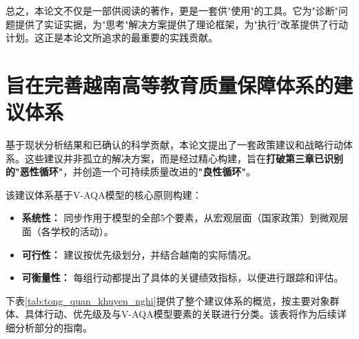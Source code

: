 总之，本论文不仅是一部供阅读的著作，更是一套供"使用"的工具。它为"诊断"问题提供了实证实据，为"思考"解决方案提供了理论框架，为"执行"改革提供了行动计划。这正是本论文所追求的最重要的实践贡献。



\section{旨在完善越南高等教育质量保障体系的建议体系}
\label{sec:he_thong_khuyen_nghi}

基于现状分析结果和已确认的科学贡献，本论文提出了一套政策建议和战略行动体系。这些建议并非孤立的解决方案，而是经过精心构建，旨在\textbf{打破第三章已识别的"恶性循环"}，并创造一个可持续质量改进的\textbf{"良性循环"}。

该建议体系基于V-AQA模型的核心原则构建：
\begin{itemize}
    \item \textbf{系统性：} 同步作用于模型的全部5个要素，从宏观层面（国家政策）到微观层面（各学校的活动）。
    \item \textbf{可行性：} 建议按优先级划分，并结合越南的实际情况。
    \item \textbf{可衡量性：} 每组行动都提出了具体的关键绩效指标，以便进行跟踪和评估。
\end{itemize}

下表\ref{tab:tong_quan_khuyen_nghi}提供了整个建议体系的概览，按主要对象群体、具体行动、优先级及与V-AQA模型要素的关联进行分类。该表将作为后续详细分析部分的指南。

